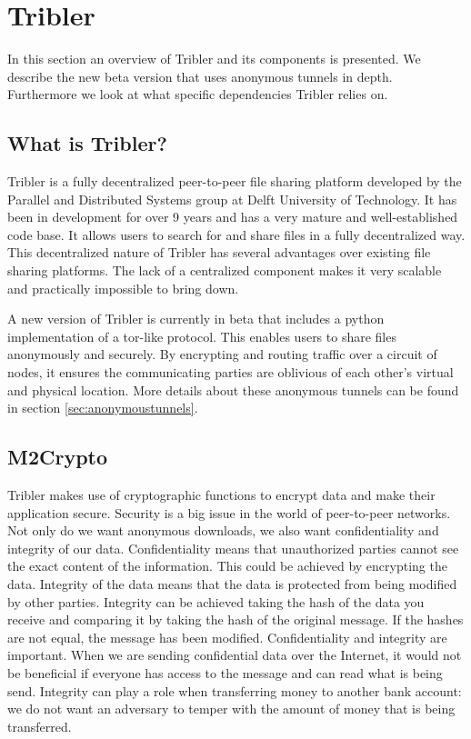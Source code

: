 \section{Tribler}
	\label{scc:tribler}
	In this section an overview of Tribler and its components is presented. We describe the new beta version that uses anonymous tunnels in depth. Furthermore we look at what specific dependencies Tribler relies on.

	\subsection{What is Tribler?}
		Tribler is a fully decentralized peer-to-peer file sharing platform developed by the Parallel and Distributed Systems group at Delft University of Technology. It has been in development for over 9 years and has a very mature and well-established code base. It allows users to search for and share files in a fully decentralized way. This decentralized nature of Tribler has several advantages over existing file sharing platforms. The lack of a centralized component makes it very scalable and practically impossible to bring down.
		
		A new version of Tribler is currently in beta that includes a python implementation of a tor-like protocol. This enables users to share files anonymously and securely. By encrypting and routing traffic over a circuit of nodes, it ensures the communicating parties are oblivious of each other's virtual and physical location. More details about these anonymous tunnels can be found in section \ref{sec:anonymoustunnels}.

	\subsection{M2Crypto}
		Tribler makes use of cryptographic functions to encrypt data and make their application secure. Security is a big issue in the world of peer-to-peer networks. Not only do we want anonymous downloads, we also want confidentiality and integrity of our data. Confidentiality means that unauthorized parties cannot see the exact content of the information. This could be achieved by encrypting the data. Integrity of the data means that the data is protected from being modified by other parties. Integrity can be achieved taking the hash of the data you receive and comparing it by taking the hash of the original message. If the hashes are not equal, the message has been modified. Confidentiality and integrity are important. When we are sending confidential data over the Internet, it would not be beneficial if everyone has access to the message and can read what is being send. Integrity can play a role when transferring money to another bank account: we do not want an adversary to temper with the amount of money that is being transferred.
		
